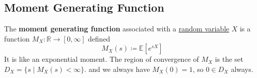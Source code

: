 \subsection{Moment Generating Function}

	\begin{definition}
	  \label{def:moment-generating-function-mgf}
		The \textbf{moment generating function} associated with a \hyperref[def:random-variable]{random variable} $X$ is a function $M_X: \mathbb{R} \to [0, \infty]$ defined 
		\begin{equation}
			M_X (s) \coloneqq \mathbb{E}[e^{s X}]
		\end{equation}
		It is like an exponential moment. The region of convergence of $M_X$ is the set $D_X = \{s \mid M_X (s) < \infty\}$. 
		and we always have $M_X (0) = 1$, so $0 \in D_X$ always. 
	\end{definition}

